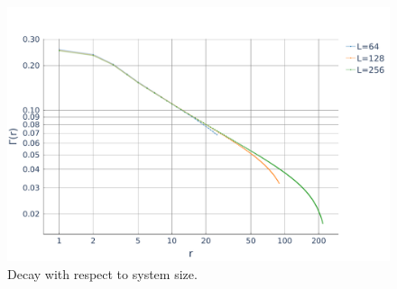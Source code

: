 \documentclass[aspectratio=169]{beamer}
\begin{document}
\begin{frame}
\begin{onlyenv}
\begin{columns}[onlytextwidth]
      \begin{column}{0.5\textwidth}
        \begin{figure}[ht]
          \centering
          \includegraphics[scale=0.2]{../img/Correlations-lengths.pdf}
          \caption*{Decay with respect to system size.}
        \end{figure}
      \end{column}
    \end{columns}
  \end{onlyenv}
\end{frame}
\end{document}
